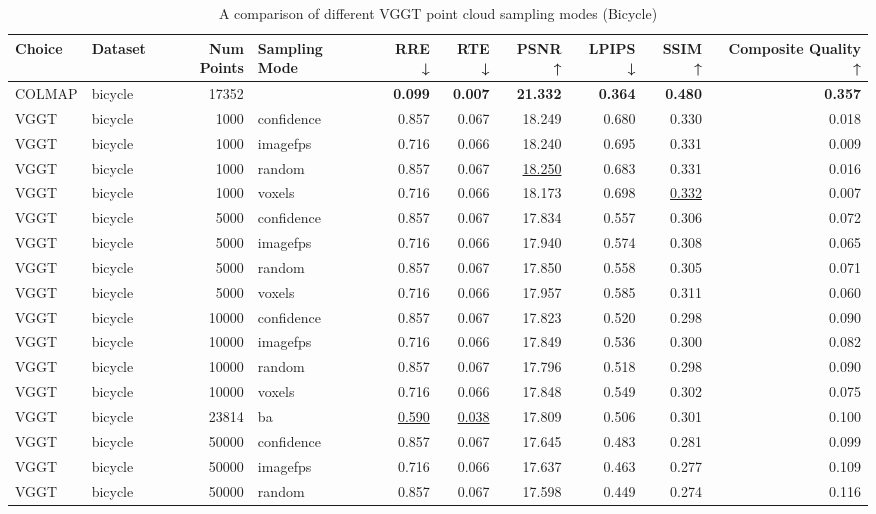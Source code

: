 \begin{table}[H]
\caption{\ifdefined\customcaption \customcaption \else A comparison of different VGGT point cloud sampling modes (Bicycle) \fi}
\label{tab:03_sampling_mode_bicycle}
\centering
\scriptsize
\begin{tabular}{llrlrrrrrr}
\toprule
Choice & Dataset & Num Points & Sampling Mode & RRE ↓ & RTE ↓ & PSNR ↑ & LPIPS ↓ & SSIM ↑ & Composite Quality ↑ \\
\midrule
COLMAP & bicycle & 17352 &  & \textbf{0.099} & \textbf{0.007} & \textbf{21.332} & \textbf{0.364} & \textbf{0.480} & \textbf{0.357} \\
VGGT & bicycle & 1000 & confidence & 0.857 & 0.067 & 18.249 & 0.680 & 0.330 & 0.018 \\
VGGT & bicycle & 1000 & imagefps & 0.716 & 0.066 & 18.240 & 0.695 & 0.331 & 0.009 \\
VGGT & bicycle & 1000 & random & 0.857 & 0.067 & \underline{18.250} & 0.683 & 0.331 & 0.016 \\
VGGT & bicycle & 1000 & voxels & 0.716 & 0.066 & 18.173 & 0.698 & \underline{0.332} & 0.007 \\
VGGT & bicycle & 5000 & confidence & 0.857 & 0.067 & 17.834 & 0.557 & 0.306 & 0.072 \\
VGGT & bicycle & 5000 & imagefps & 0.716 & 0.066 & 17.940 & 0.574 & 0.308 & 0.065 \\
VGGT & bicycle & 5000 & random & 0.857 & 0.067 & 17.850 & 0.558 & 0.305 & 0.071 \\
VGGT & bicycle & 5000 & voxels & 0.716 & 0.066 & 17.957 & 0.585 & 0.311 & 0.060 \\
VGGT & bicycle & 10000 & confidence & 0.857 & 0.067 & 17.823 & 0.520 & 0.298 & 0.090 \\
VGGT & bicycle & 10000 & imagefps & 0.716 & 0.066 & 17.849 & 0.536 & 0.300 & 0.082 \\
VGGT & bicycle & 10000 & random & 0.857 & 0.067 & 17.796 & 0.518 & 0.298 & 0.090 \\
VGGT & bicycle & 10000 & voxels & 0.716 & 0.066 & 17.848 & 0.549 & 0.302 & 0.075 \\
VGGT & bicycle & 23814 & ba & \underline{0.590} & \underline{0.038} & 17.809 & 0.506 & 0.301 & 0.100 \\
VGGT & bicycle & 50000 & confidence & 0.857 & 0.067 & 17.645 & 0.483 & 0.281 & 0.099 \\
VGGT & bicycle & 50000 & imagefps & 0.716 & 0.066 & 17.637 & 0.463 & 0.277 & 0.109 \\
VGGT & bicycle & 50000 & random & 0.857 & 0.067 & 17.598 & 0.449 & 0.274 & 0.116 \\

\end{tabular}
\end{table}
